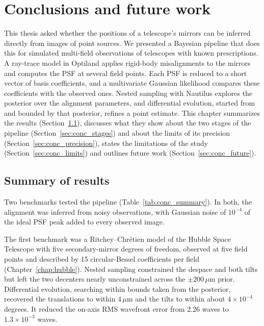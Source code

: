 \chapter{Conclusions and future work}\label{chap:conclusions}
\thispagestyle{fancy} %

This thesis asked whether the positions of a telescope's mirrors can be inferred directly from images of point sources. We presented a Bayesian pipeline that does this for simulated multi-field observations of telescopes with known prescriptions. A ray-trace model in Optiland applies rigid-body misalignments to the mirrors and computes the PSF at several field points. Each PSF is reduced to a short vector of basis coefficients, and a multivariate Gaussian likelihood compares these coefficients with the observed ones. Nested sampling with Nautilus explores the posterior over the alignment parameters, and differential evolution, started from and bounded by that posterior, refines a point estimate. This chapter summarizes the results (Section~\ref{sec:conc_results}), discusses what they show about the two stages of the pipeline (Section~\ref{sec:conc_stages}) and about the limits of its precision (Section~\ref{sec:conc_precision}), states the limitations of the study (Section~\ref{sec:conc_limits}) and outlines future work (Section~\ref{sec:conc_future}).

\section{Summary of results}\label{sec:conc_results}

Two benchmarks tested the pipeline (Table~\ref{tab:conc_summary}). In both, the alignment was inferred from noisy observations, with Gaussian noise of $10^{-4}$ of the ideal PSF peak added to every observed image.

The first benchmark was a Ritchey--Chr{\'e}tien model of the Hubble Space Telescope with five secondary-mirror degrees of freedom, observed at five field points and described by 15 circular-Bessel coefficients per field (Chapter~\ref{chap:hubble}). Nested sampling constrained the despace and both tilts but left the two decenters nearly unconstrained across the $\pm200\,\mu\mathrm{m}$ prior. Differential evolution, searching within bounds taken from the posterior, recovered the translations to within $4\,\mu\mathrm{m}$ and the tilts to within about $4\times10^{-4}$ degrees. It reduced the on-axis RMS wavefront error from 2.26 waves to $1.3\times10^{-3}$ waves.

